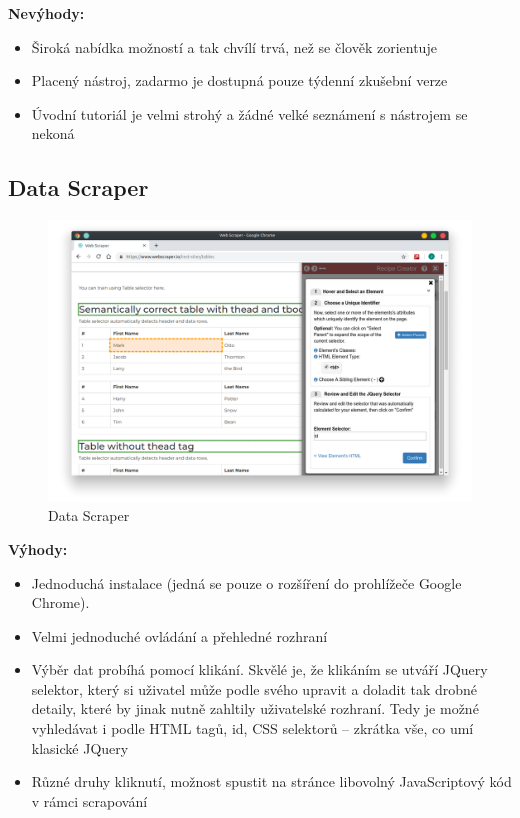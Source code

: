 \documentclass[thesis=B,czech]{FITthesis}[2012/06/26]
\begin{document}
\textbf{Nevýhody:}
\begin{itemize}
	\item Široká nabídka možností a tak chvílí trvá, než se člověk zorientuje
	\item Placený nástroj, zadarmo je dostupná pouze týdenní zkušební verze
	\item Úvodní tutoriál je velmi strohý a žádné velké seznámení s nástrojem se nekoná
\end{itemize}


\newpage
\subsection{Data Scraper}
\begin{figure}[h]
	\includegraphics[width=\linewidth]{images/DataScraper.png}
	\caption{Data Scraper}
	\label{fig:dataScraper}
\end{figure}
\textbf{Výhody:}
\begin{itemize}
	\item Jednoduchá instalace (jedná se pouze o rozšíření do prohlížeče Google Chrome).
	\item Velmi jednoduché ovládání a přehledné rozhraní
	\item Výběr dat probíhá pomocí klikání. Skvělé je, že klikáním se utváří JQuery selektor, který si uživatel může podle svého upravit a doladit tak drobné detaily, které by jinak nutně zahltily uživatelské rozhraní. Tedy je možné vyhledávat i podle HTML tagů, id, CSS selektorů -- zkrátka vše, co umí klasické JQuery
	\item Různé druhy kliknutí, možnost spustit na stránce libovolný JavaScriptový kód v rámci scrapování
\end{itemize}
\end{document}
